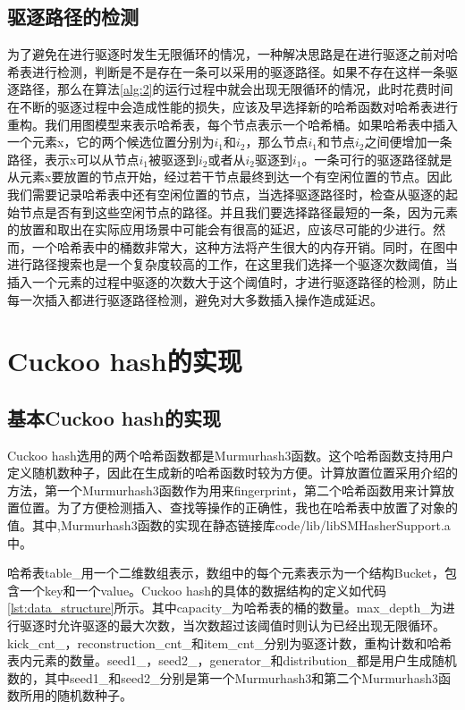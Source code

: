 \documentclass[supercite]{Experimental_Report}
\theoremstyle{definition}
\begin{document}
\subsection{驱逐路径的检测}
为了避免在进行驱逐时发生无限循环的情况，一种解决思路是在进行驱逐之前对哈希表进行检测，判断是不是存在一条可以采用的驱逐路径。如果不存在这样一条驱逐路径，那么在算法\ref{alg:2}的运行过程中就会出现无限循环的情况，此时花费时间在不断的驱逐过程中会造成性能的损失，应该及早选择新的哈希函数对哈希表进行重构。我们用图模型来表示哈希表，每个节点表示一个哈希桶。如果哈希表中插入一个元素x，它的两个候选位置分别为$i_1$和$i_2$，那么节点$i_1$和节点$i_2$之间便增加一条路径，表示x可以从节点$i_1$被驱逐到$i_2$或者从$i_2$驱逐到$i_1$。一条可行的驱逐路径就是从元素x要放置的节点开始，经过若干节点最终到达一个有空闲位置的节点。因此我们需要记录哈希表中还有空闲位置的节点，当选择驱逐路径时，检查从驱逐的起始节点是否有到这些空闲节点的路径。并且我们要选择路径最短的一条，因为元素的放置和取出在实际应用场景中可能会有很高的延迟，应该尽可能的少进行。然而，一个哈希表中的桶数非常大，这种方法将产生很大的内存开销。同时，在图中进行路径搜索也是一个复杂度较高的工作，在这里我们选择一个驱逐次数阈值，当插入一个元素的过程中驱逐的次数大于这个阈值时，才进行驱逐路径的检测，防止每一次插入都进行驱逐路径检测，避免对大多数插入操作造成延迟。

\newpage

\section{Cuckoo hash的实现}

\subsection{基本Cuckoo hash的实现}
Cuckoo hash选用的两个哈希函数都是Murmurhash3函数。这个哈希函数支持用户定义随机数种子，因此在生成新的哈希函数时较为方便。计算放置位置采用介绍的方法，第一个Murmurhash3函数作为用来fingerprint，第二个哈希函数用来计算放置位置。为了方便检测插入、查找等操作的正确性，我也在哈希表中放置了对象的值。其中,Murmurhash3函数的实现在静态链接库code/lib/libSMHasherSupport.a中。

哈希表table\_用一个二维数组表示，数组中的每个元素表示为一个结构Bucket，包含一个key和一个value。Cuckoo hash的具体的数据结构的定义如代码\ref{lst:data_structure}所示。其中capacity\_为哈希表的桶的数量。max\_depth\_为进行驱逐时允许驱逐的最大次数，当次数超过该阈值时则认为已经出现无限循环。kick\_cnt\_，reconstruction\_cnt\_和item\_cnt\_分别为驱逐计数，重构计数和哈希表内元素的数量。seed1\_，seed2\_，generator\_和distribution\_都是用户生成随机数的，其中seed1\_和seed2\_分别是第一个Murmurhash3和第二个Murmurhash3函数所用的随机数种子。
\end{document}
